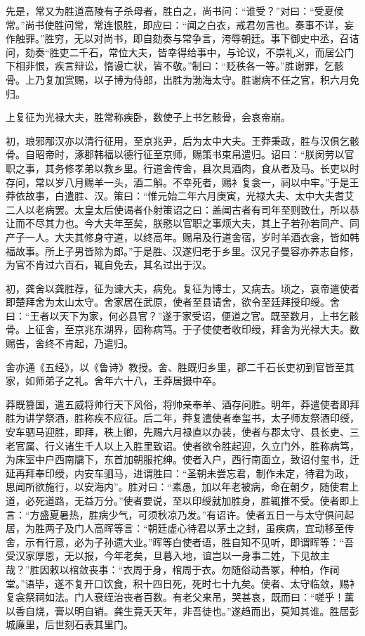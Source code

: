 \documentclass[12pt,UTF8]{ctexbook}
\begin{document}
先是，常又为胜道高陵有子杀母者，胜白之，尚书问：“谁受？”对曰：“受夏侯常。”尚书使胜问常，常连恨胜，即应曰：“闻之白衣，戒君勿言也。奏事不详，妄作触罪。”胜穷，无以对尚书，即自劾奏与常争言，洿辱朝廷。事下御史中丞，召诘问，劾奏“胜吏二千石，常位大夫，皆幸得给事中，与论议，不崇礼义，而居公门下相非恨，疾言辩讼，惰谩亡状，皆不敬。”制曰：“贬秩各一等。”胜谢罪，乞骸骨。上乃复加赏赐，以子博为侍郎，出胜为渤海太守。胜谢病不任之官，积六月免归。



上复征为光禄大夫，胜常称疾卧，数使子上书乞骸骨，会哀帝崩。



初，琅邪邴汉亦以清行征用，至京兆尹，后为太中大夫。王莽秉政，胜与汉俱乞骸骨。自昭帝时，涿郡韩福以德行征至京师，赐策书束帛遣归。诏曰：“朕闵劳以官职之事，其务修孝弟以教乡里。行道舍传舍，县次具酒肉，食从者及马。长吏以时存问，常以岁八月赐羊一头，酒二斛。不幸死者，赐衤复衾一，祠以中牢。”于是王莽依故事，白遣胜、汉。策曰：“惟元始二年六月庚寅，光禄大夫、太中大夫耆艾二人以老病罢。太皇太后使谒者仆射策诏之曰：盖闻古者有司年至则致仕，所以恭让而不尽其力也。今大夫年至矣，朕愍以官职之事烦大夫，其上子若孙若同产、同产子一人。大夫其修身守道，以终高年。赐帛及行道舍宿，岁时羊酒衣衾，皆如韩福故事。所上子男皆除为郎。”于是胜、汉遂归老于乡里。汉兄子曼容亦养志自修，为官不肯过六百石，辄自免去，其名过出于汉。



初，龚舍以龚胜荐，征为谏大夫，病免。复征为博士，又病去。顷之，哀帝遣使者即楚拜舍为太山太守。舍家居在武原，使者至县请舍，欲令至廷拜授印绶。舍曰：“王者以天下为家，何必县官？”遂于家受诏，便道之官。既至数月，上书乞骸骨。上征舍，至京兆东湖界，固称病笃。于子使使者收印绶，拜舍为光禄大夫。数赐告，舍终不肯起，乃遣归。



舍亦通《五经》，以《鲁诗》教授。舍、胜既归乡里，郡二千石长吏初到官皆至其家，如师弟子之礼。舍年六十八，王莽居摄中卒。



莽既篡国，遣五威将帅行天下风俗，将帅亲奉羊、酒存问胜。明年，莽遣使者即拜胜为讲学祭酒，胜称疾不应征。后二年，莽复遣使者奉玺书，太子师友祭酒印绶，安车驷马迎胜，即拜，秩上卿，先赐六月禄直以办装，使者与郡太守、县长吏、三老官属、行义诸生千人以上入胜里致诏。使者欲令胜起迎，久立门外，胜称病笃，为床室中户西南牖下，东首加朝服拕绅。使者入户，西行南面立，致诏付玺书，迁延再拜奉印绶，内安车驷马，进谓胜曰：“圣朝未尝忘君，制作未定，待君为政，思闻所欲施行，以安海内”。胜对曰：“素愚，加以年老被病，命在朝夕，随使君上道，必死道路，无益万分。”使者要说，至以印绶就加胜身，胜辄推不受。使者即上言：“方盛夏暑热，胜病少气，可须秋凉乃发。”有诏许。使者五日一与太守俱问起居，为胜两子及门人高晖等言：“朝廷虚心待君以茅土之封，虽疾病，宜动移至传舍，示有行意，必为子孙遗大业。”晖等白使者语，胜自知不见听，即谓晖等：“吾受汉家厚恩，无以报，今年老矣，旦暮入地，谊岂以一身事二姓，下见故主哉？”胜因敕以棺敛丧事：“衣周于身，棺周于衣。勿随俗动吾冢，种柏，作祠堂。”语毕，遂不复开口饮食，积十四日死，死时七十九矣。使者、太守临敛，赐衤复衾祭祠如法。门人衰绖治丧者百数。有老父来吊，哭甚哀，既而曰：“嗟乎！薰以香自烧，膏以明自销。龚生竟夭天年，非吾徒也。”遂趋而出，莫知其谁。胜居彭城廉里，后世刻石表其里门。
\end{document}
